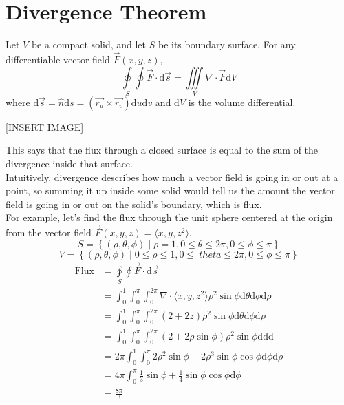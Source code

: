 \section{Divergence Theorem}
\begin{theorem}
	Let $V$ be a compact solid, and let $S$ be its boundary surface. For any differentiable vector field $\vec{F}(x,y,z)$,
	\begin{equation*}
		\oint\limits_{S}{\oint{\vec{F} \cdot \mathrm{d}\vec{s}}} = \iiint\limits_{V}{\nabla \cdot \vec{F}\mathrm{d}V}
	\end{equation*}
	where $\mathrm{d}\vec{s} = \hat{n}\mathrm{d}s = (\vec{r_u}\times\vec{r_v})\mathrm{d}u\mathrm{d}v$ and $\mathrm{d}V$ is the volume differential.
\end{theorem}

[INSERT IMAGE]

\noindent
This says that the flux through a closed surface is equal to the sum of the divergence inside that surface.\\
Intuitively, divergence describes how much a vector field is going in or out at a point, so summing it up inside some solid would tell us the amount the vector field is going in or out on the solid’s boundary, which is flux.\\

\noindent
For example, let’s find the flux through the unit sphere centered at the origin from the vector field $\vec{F}(x,y,z) = \langle x, y, z^2 \rangle$.
\begin{equation*}
	S = \left\{(\rho, \theta, \phi) \mid \rho=1, 0 \leq \theta \leq 2\pi, 0 \leq \phi \leq \pi \right\}	
\end{equation*}
\begin{equation*}
	V = \left\{(\rho, \theta, \phi) \mid 0 \leq \rho \leq 1, 0 \leq\ theta \leq 2\pi, 0 \leq \phi \leq \pi \right\}	
\end{equation*}
\begin{align*}
	\text{Flux} &= \oint\limits_{S}{\oint{\vec{F} \cdot \mathrm{d}\vec{s}}}	\\
	&= \int_{0}^{1}{\int_{0}^{\pi}{\int_{0}^{2\pi}{\nabla \cdot \langle x, y, z^2 \rangle\rho^2\sin{\phi}\mathrm{d}\theta}\mathrm{d}\phi}\mathrm{d}\rho} \\
	&= \int_{0}^{1}{\int_{0}^{\pi}{\int_{0}^{2\pi}{(2 + 2z)\rho^2\sin{\phi}\mathrm{d}\theta}\mathrm{d}\phi}\mathrm{d}\rho} \\
	&= \int_{0}^{1}{\int_{0}^{\pi}{\int_{0}^{2\pi}{(2 + 2\rho\sin{\phi})\rho^2\sin{\phi}\mathrm{d}}\mathrm{d}}\mathrm{d}} \\
	&= 2\pi\int_{0}^{1}{\int_{0}^{\pi}{2\rho^2\sin{\phi} + 2\rho^3\sin{\phi}\cos{\phi}\mathrm{d}\phi}\mathrm{d}\rho} \\
	&= 4\pi\int_{0}^{\pi}{\frac{1}{3}\sin{\phi} + \frac{1}{4}\sin{\phi}\cos{\phi}\mathrm{d}\phi} \\
	&= \frac{8\pi}{3}
\end{align*}

